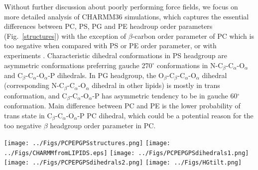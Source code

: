\documentclass[aps,prl,superscriptaddress,twocolumn]{revtex4}
\begin{document}
Without further discussion about poorly performing force fields, we focus on more detailed analysis
of CHARMM36 simulations, which captures the essential differences between
PC, PS, PG and PE headroup order parameters  (Fig.~\ref{structures}) with the exception of $\beta$-carbon order parameter of PC
which is too negative when compared with PS or PE order parameter, or with experiments \cite{botan15}.
Characteristic dihedral conformations in PS headgroup are asymmetric conformations
preferring gauche 270$^\circ$ conformations in N-C$_\beta$-C$_\alpha$-O$_\alpha$ and
C$_\beta$-C$_\alpha$-O$_\alpha$-P dihedrals. 
In PG headgroup, the O$_\beta$-C$_\beta$-C$_\alpha$-O$_\alpha$ dihedral (corresponding N-C$_\beta$-C$_\alpha$-O$_\alpha$ dihedral in other lipids)
is mostly in trans conformation, and C$_\beta$-C$_\alpha$-O$_\alpha$-P  has asymmetric tendency to be in
gauche 60$^\circ$ conformation. 
Main difference between PC and PE is the lower probability of trans state in C$_\beta$-C$_\alpha$-O$_\alpha$-P PC dihedral,
which could be a potential reason for the too negative $\beta$ headgroup order parameter in PC.

\begin{figure*}[!h]
  \centering
  \texttt{[image: ../Figs/PCPEPGPSstructures.png]}
  \texttt{[image: ../Figs/CHARMMfromLIPIDS.eps]}
  \texttt{[image: ../Figs/PCPEPGPSdihedrals1.png]}
  \texttt{[image: ../Figs/PCPEPGPSdihedrals2.png]}
  \texttt{[image: ../Figs/HGtilt.png]}
  \caption{\label{structures}
    Overlayed snapshots and dihedral angle distributions from CHARMM36 simulations of different lipids
    which give the best agreement with experiments.
  }
   \\
   \\
   \\
\end{figure*}
\end{document}
